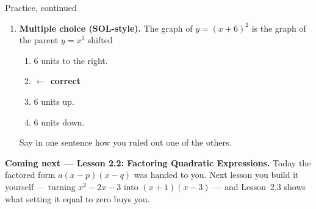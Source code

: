 \documentclass[12pt]{article}
\begin{document}
\begin{notesbox}{Practice, continued}
\begin{enumerate}[leftmargin=1.9em, itemsep=8pt, start=4]
  \item \textbf{Multiple choice (SOL-style).} The graph of $y=(x+6)^2$ is the graph of the parent
        $y=x^2$ shifted
    \begin{enumerate}[label=\Alph*., leftmargin=2.2em, itemsep=1pt]
      \item $6$ units to the right.
      \item {} \hfill \textcolor{keyred}{\textbf{$\leftarrow$ correct}}
      \item $6$ units up.
      \item $6$ units down.
    \end{enumerate}
    Say in one sentence how you ruled out one of the others. 
\end{enumerate}
\end{notesbox}

\vspace{0.06in}

\boxguard[6]
\begin{spiralbox}
\small
\textbf{Coming next --- Lesson 2.2: Factoring Quadratic Expressions.} Today the factored form
$a(x-p)(x-q)$ was handed to you. Next lesson you build it yourself --- turning $x^2-2x-3$ into
$(x+1)(x-3)$ --- and Lesson~2.3 shows what setting it equal to zero buys you.
\end{spiralbox}
\end{document}
